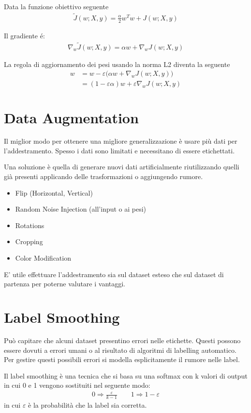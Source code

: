 Data la funzione obiettivo seguente
\begin{align*}
  \tilde{J}(w; X, y) = \frac{\alpha}{2} w^T w + J(w; X, y)
\end{align*}

Il gradiente é:
\begin{align*}
  \nabla_w \tilde{J}(w; X, y) = \alpha w + \nabla_w J(w; X, y)
\end{align*}

La regola di aggiornamento dei pesi usando la norma L2 diventa la seguente
\begin{align*}
  w & = w - \varepsilon \big( \alpha w + \nabla_w J(w; X, y) \big)   \\
    & = (1 - \varepsilon \alpha) w + \varepsilon \nabla_w J(w; X, y)
\end{align*}

\section{Data Augmentation}
Il miglior modo per ottenere una migliore generalizzazione è usare più dati per l'addestramento.
Spesso i dati sono limitati e necessitano di essere etichettati.

Una soluzione è quella di generare nuovi dati artificialmente riutilizzando quelli già presenti applicando delle trasformazioni o aggiungendo rumore.

\begin{itemize}
  \item Flip (Horizontal, Vertical)
  \item Random Noise Injection (all'input o ai pesi)
  \item Rotations
  \item Cropping
  \item Color Modification
\end{itemize}

E' utile effettuare l'addestramento sia sul dataset esteso che sul dataset di partenza per poterne valutare i vantaggi.

\section{Label Smoothing}
Può capitare che alcuni dataset presentino errori nelle etichette. Questi possono essere dovuti a errori umani o al risultato di
algoritmi di labelling automatico. Per gestire questi possibili errori si modella esplicitamente il rumore nelle label.

Il label smoothing è una tecnica che si basa su una softmax con k valori di output in cui 0 e 1 vengono sostituiti nel seguente modo:
\begin{align*}
  0 \Rightarrow \frac{\varepsilon}{k - 1} \qquad 1 \Rightarrow 1 - \varepsilon
\end{align*}
in cui $\varepsilon$ è la probabilità che la label sia corretta.

